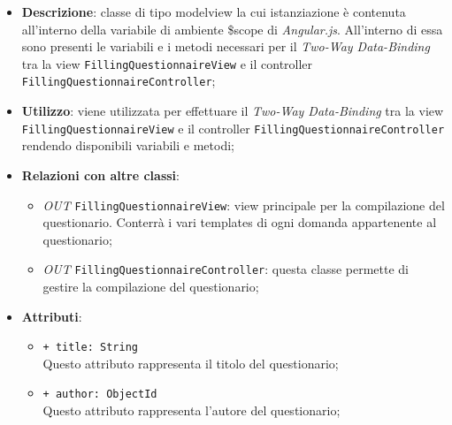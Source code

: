 	\begin{itemize}
		\item \textbf{Descrizione}: classe di tipo modelview la cui istanziazione è contenuta all'interno della variabile di ambiente \$scope di \textit{Angular.js}. All'interno di essa sono presenti le variabili e i metodi necessari per il \textit{Two-Way Data-Binding} tra la view \texttt{FillingQuestionnaireView} e il controller \texttt{FillingQuestionnaireController};
		\item \textbf{Utilizzo}: viene utilizzata per effettuare il \textit{Two-Way Data-Binding} tra la view \texttt{FillingQuestionnaireView} e il controller \texttt{FillingQuestionnaireController} rendendo disponibili variabili e metodi;
		\item \textbf{Relazioni con altre classi}: 
		\begin{itemize}
			\item \textit{OUT} \texttt{FillingQuestionnaireView}: view principale per la compilazione del questionario. Conterrà i vari templates di ogni domanda appartenente al questionario; 
			\item \textit{OUT} \texttt{FillingQuestionnaireController}: questa classe permette di gestire la compilazione del questionario;
		\end{itemize}
		\item \textbf{Attributi}: 
		\begin{itemize}
			\item \texttt{+ title: String}\\
			Questo attributo rappresenta il titolo del questionario;
			\item \texttt{+ author: ObjectId}\\
			Questo attributo rappresenta l'autore del questionario;
	

\end{itemize}
\end{itemize}
